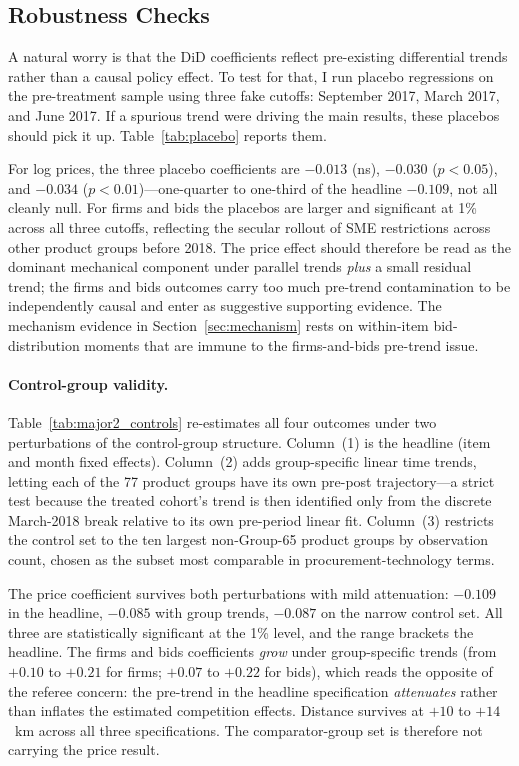 \subsection{Robustness Checks}

A natural worry is that the DiD coefficients reflect pre-existing differential trends rather than a causal policy effect. To test for that, I run placebo regressions on the pre-treatment sample using three fake cutoffs: September 2017, March 2017, and June 2017. If a spurious trend were driving the main results, these placebos should pick it up. Table~\ref{tab:placebo} reports them.



For log prices, the three placebo coefficients are $-0.013$ (ns), $-0.030$ ($p<0.05$), and $-0.034$ ($p<0.01$)---one-quarter to one-third of the headline $-0.109$, not all cleanly null. For firms and bids the placebos are larger and significant at 1\% across all three cutoffs, reflecting the secular rollout of SME restrictions across other product groups before 2018. The price effect should therefore be read as the dominant mechanical component under parallel trends \emph{plus} a small residual trend; the firms and bids outcomes carry too much pre-trend contamination to be independently causal and enter as suggestive supporting evidence. The mechanism evidence in Section~\ref{sec:mechanism} rests on within-item bid-distribution moments that are immune to the firms-and-bids pre-trend issue.

\paragraph{Control-group validity.}
Table~\ref{tab:major2_controls} re-estimates all four outcomes under two perturbations of the control-group structure. Column~(1) is the headline (item and month fixed effects). Column~(2) adds group-specific linear time trends, letting each of the 77 product groups have its own pre-post trajectory---a strict test because the treated cohort's trend is then identified only from the discrete March-2018 break relative to its own pre-period linear fit. Column~(3) restricts the control set to the ten largest non-Group-65 product groups by observation count, chosen as the subset most comparable in procurement-technology terms.



The price coefficient survives both perturbations with mild attenuation: $-0.109$ in the headline, $-0.085$ with group trends, $-0.087$ on the narrow control set. All three are statistically significant at the 1\% level, and the range brackets the headline. The firms and bids coefficients \emph{grow} under group-specific trends (from $+0.10$ to $+0.21$ for firms; $+0.07$ to $+0.22$ for bids), which reads the opposite of the referee concern: the pre-trend in the headline specification \emph{attenuates} rather than inflates the estimated competition effects. Distance survives at $+10$ to $+14$~km across all three specifications. The comparator-group set is therefore not carrying the price result.

